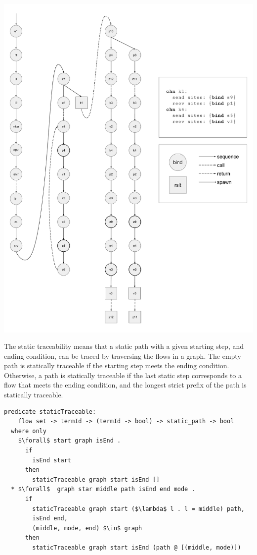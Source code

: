 \documentclass[letterpaper, 11pt]{extarticle}
\begin{document}
\includegraphics[width=.9\textwidth]{cml-graph.pdf}

The static traceability means that a static path with a given starting step, and ending
condition, can be traced by traversing the flows in a graph.
The empty path is statically traceable if the starting step meets the ending condition.
Otherwise, a path is statically traceable if the last static step corresponds to a flow
that meets the ending condition, and the longest strict prefix of the path is statically
traceable.  

\begin{lstlisting}[language=logic, mathescape]
  predicate staticTraceable:
    flow set -> termId -> (termId -> bool) -> static_path -> bool
  where only
    $\forall$ start graph isEnd .
      if
        isEnd start
      then
        staticTraceable graph start isEnd []
  * $\forall$  graph star middle path isEnd end mode .
      if 
        staticTraceable graph start ($\lambda$ l . l = middle) path, 
        isEnd end, 
        (middle, mode, end) $\in$ graph 
      then
        staticTraceable graph start isEnd (path @ [(middle, mode)])
\end{lstlisting}
\end{document}
